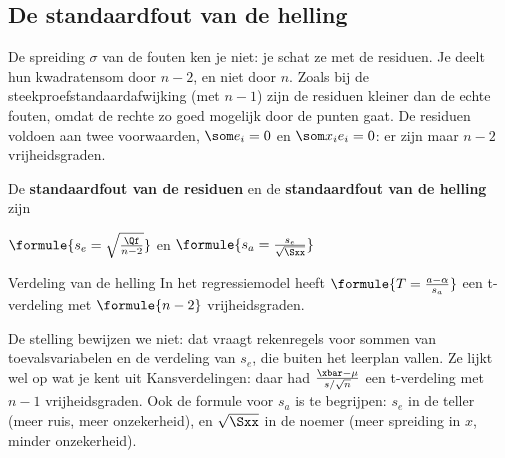 \subsection{De standaardfout van de helling}

De spreiding $\sigma$ van de fouten ken je niet: je schat ze met de residuen. Je deelt hun kwadratensom door $n - 2$, en niet door $n$. Zoals bij de steekproefstandaardafwijking (met $n - 1$) zijn de residuen kleiner dan de echte fouten, omdat de rechte zo goed mogelijk door de punten gaat. De residuen voldoen aan twee voorwaarden, $\som e_i = 0$ en $\som x_i e_i = 0$: er zijn maar $n - 2$ vrijheidsgraden.

\begin{theorie}
De \textbf{\textcolor{accent}{standaardfout van de residuen}} en de \textbf{\textcolor{accent}{standaardfout van de helling}} zijn

\vspace{1mm}
\qquad $\formule{s_e = \sqrt{\frac{\Qf}{n - 2}}}$ \quad en \quad $\formule{s_a = \frac{s_e}{\sqrt{\Sxx}}}$

\begin{stelling}{Verdeling van de helling}
In het regressiemodel heeft \quad $\formule{T = \frac{a - \alpha}{s_a}}$ \quad een t-verdeling met $\formule{n - 2}$ vrijheidsgraden.
\end{stelling}
\end{theorie}

De stelling bewijzen we niet: dat vraagt rekenregels voor sommen van toevalsvariabelen en de verdeling van $s_e$, die buiten het leerplan vallen. Ze lijkt wel op wat je kent uit Kansverdelingen: daar had $\frac{\xbar - \mu}{s/\sqrt n}$ een t-verdeling met $n - 1$ vrijheidsgraden. Ook de formule voor $s_a$ is te begrijpen: $s_e$ in de teller (meer ruis, meer onzekerheid), en $\sqrt{\Sxx}$ in de noemer (meer spreiding in $x$, minder onzekerheid).


